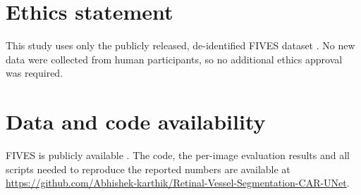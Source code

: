 \documentclass[a4paper,fleqn]{cas-sc}
\begin{document}
\section*{Ethics statement}
This study uses only the publicly released, de-identified FIVES dataset \citep{jin2022fives}. No new data were collected from human participants, so no additional ethics approval was required.

\section*{Data and code availability}
FIVES is publicly available \citep{jin2022fives}. The code, the per-image evaluation results and all scripts needed to reproduce the reported numbers are available at\\ \url{https://github.com/Abhishek-karthik/Retinal-Vessel-Segmentation-CAR-UNet}.



\end{document}
